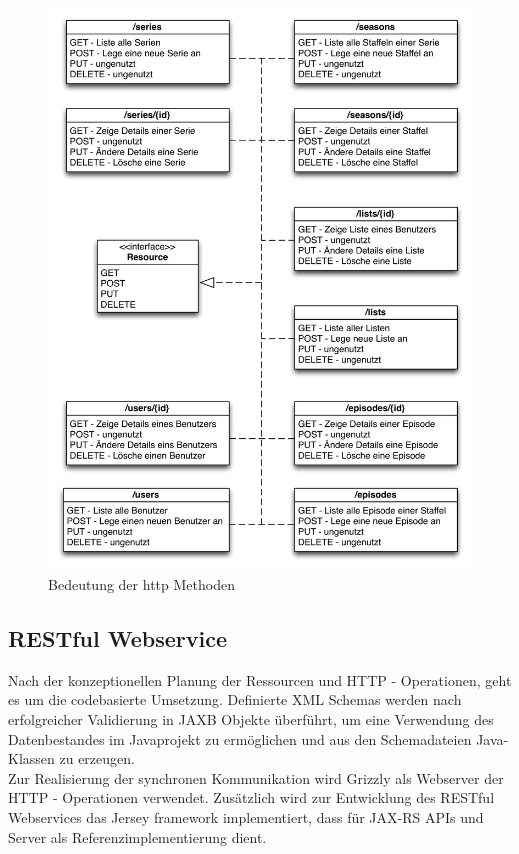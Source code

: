 \documentclass[a4paper]{article}
\begin{document}
\begin{figure}[H]
\includegraphics[width=1\textwidth]{images/bedeutunghttpmethoden.png}
\caption{Bedeutung der http Methoden}
\label{bedeutunghttpmethoden}
\end{figure}

\newpage

\subsection{RESTful Webservice}

Nach der konzeptionellen Planung der Ressourcen und HTTP - Operationen, geht es um die codebasierte Umsetzung. Definierte XML Schemas werden nach erfolgreicher Validierung in JAXB Objekte überführt, um eine Verwendung des Datenbestandes im Javaprojekt zu ermöglichen und aus den Schemadateien Java-Klassen zu erzeugen.\\
Zur Realisierung der synchronen Kommunikation wird Grizzly als Webserver der HTTP - Operationen verwendet. Zusätzlich wird zur Entwicklung des RESTful Webservices das Jersey framework implementiert, dass für JAX-RS APIs und Server als Referenzimplementierung dient. 
\end{document}
